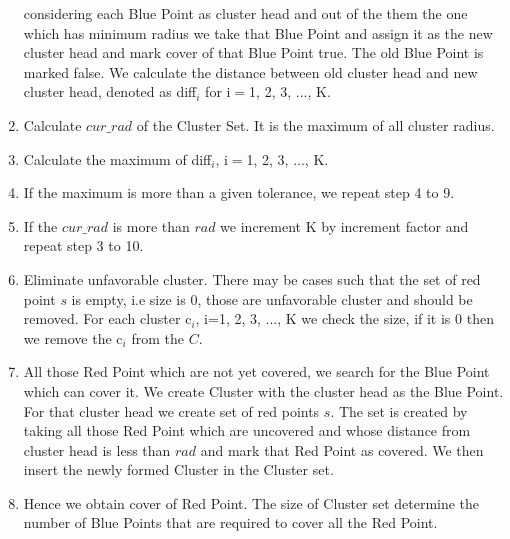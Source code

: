 \documentclass[12pt,a4wide]{report}
\theoremstyle{plain}
\theoremstyle{definition}
\theoremstyle{remark}
\begin{document}
\begin{enumerate}
considering each Blue Point as cluster head and out of the them the one which has minimum radius we take that Blue Point and 
assign it as the new cluster head and mark cover of that Blue Point true. The old Blue Point is marked false. We calculate 
the distance between old cluster head and new cluster head, denoted as diff$_{i}$ for i$=$1, 2, 3, ..., K.
\item Calculate $cur\_rad$ of the Cluster Set. It is the maximum of all cluster radius.
\item Calculate the maximum of diff$_{i}$, i$=$1, 2, 3, ..., K.
\item If the maximum is more than a  given tolerance, we repeat step 4 to 9.
\item If the $cur\_rad$ is more than $rad$ we increment K by increment factor and repeat step 3 to 10.
\item Eliminate unfavorable cluster. There may be cases such that the set of red point $s$ is empty, i.e size is 0, those
are unfavorable cluster and should be removed. For each cluster c$_{i}$, i=1, 2, 3, ..., K we check the size, if it is 0 then we 
remove the c$_{i}$ from the $C$.
 \item All those Red Point which are not yet covered, we search for the Blue Point which can cover it. We create Cluster with
  the cluster head as the Blue Point. For that cluster head we create set of red points $s$. 
  The set is created by taking all those Red Point which are uncovered and whose distance from cluster
  head is less than $rad$ and mark that Red Point as covered. We then insert the newly formed Cluster in the Cluster set.
  \item Hence we obtain cover of Red Point. The size of Cluster set determine the number of Blue Points that are required
  to cover all the Red Point.\\
\end{enumerate}
\end{document}
